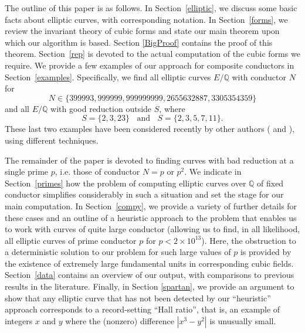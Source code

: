 The outline of this paper is as follows. In Section~\ref{elliptic}, we discuss some basic facts about elliptic curves, with corresponding
notation. In Section~\ref{forms}, we review the invariant theory of cubic forms and 
state our main theorem upon which our algorithm is based. Section \ref{BigProof} contains the proof of this theorem. Section~\ref{rep} is devoted to the actual computation of the 
cubic forms we require. We provide a few examples of our approach for composite conductors in 
Section~\ref{examples}. Specifically, we find all elliptic curves $E/\mathbb{Q}$ with conductor $N$ for 
$$
N \in \{ 399993, 999999, 999999999, 2655632887, 3305354359  \}
$$
and all  $E/\mathbb{Q}$  with good reduction outside $S$, where
$$
S = \{ 2, 3, 23 \} \; \; \mbox{ and } \; \; S = \{ 2, 3, 5, 7, 11 \}.
$$
These last two examples have been considered recently by other authors (\cite{KanMat} and \cite{Kou}), using different techniques.

The remainder of the paper is devoted to finding curves with bad reduction at a single prime $p$, i.e. those of conductor  $N=p$ or $p^2$.
We indicate in Section~\ref{primes} how the problem of computing elliptic curves over $\mathbb{Q}$ of fixed conductor simplifies considerably in such a situation and set the stage for our main computation. In Section~\ref{compy}, we provide a variety of further details for 
these cases and  an outline of a heuristic approach to the problem that enables us to work with curves of quite large conductor (allowing us to find, in all likelihood, all elliptic curves of prime conductor $p$ for $p < 2 \times 10^{13}$).  Here, the obstruction to a deterministic solution to our problem for such large values of $p$ is provided by the existence of extremely large fundamental units in corresponding cubic fields. Section~\ref{data} contains an overview 
of our output, with comparisons  to previous results in the literature. Finally, in Section \ref{spartan}, we provide an argument to show that any elliptic curve that has not been detected by our ``heuristic'' approach corresponds to a record-setting ``Hall ratio'', that is, an example of integers $x$ and $y$ where the (nonzero) difference $|x^3-y^2|$ is unusually small.




